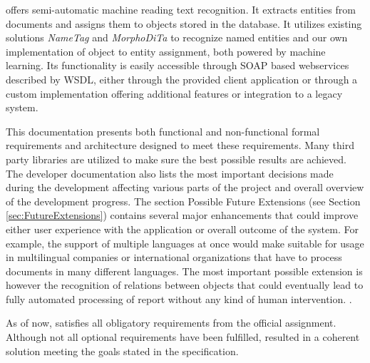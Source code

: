 
\textan{} offers semi-automatic machine reading 
text recognition. It extracts entities from documents and assigns them to objects
stored in the database. It utilizes existing solutions \emph{NameTag} and
\emph{MorphoDiTa} to recognize named entities and our own
implementation of object to entity assignment, both powered by machine learning.
Its functionality is easily accessible through SOAP based webservices described by
WSDL, either through the provided client application or through a custom
implementation offering additional features or integration to a legacy system.

This documentation presents both functional and non-functional formal requirements
and architecture designed to meet these requirements. Many third party libraries
are utilized to make sure the best possible results are achieved. The developer
documentation also lists the most important decisions made during the
development affecting various parts of the project and overall overview of the
development progress. The section Possible Future Extensions (see Section
\ref{sec:FutureExtensions}) contains several major enhancements that could improve
either user experience with the application or overall outcome of the system. For
example, the support of multiple languages at once would make \textan{} suitable
for usage in multilingual companies or international organizations that have to
process documents in many different languages. The most important possible
extension is however the recognition of relations between objects that could
eventually lead to fully automated processing of report without any kind of human
intervention. .

As of now, \textan{} satisfies all obligatory requirements from the official
assignment. Although not all optional requirements have been fulfilled, \textan{}
resulted in a coherent solution meeting the goals stated in the specification.
